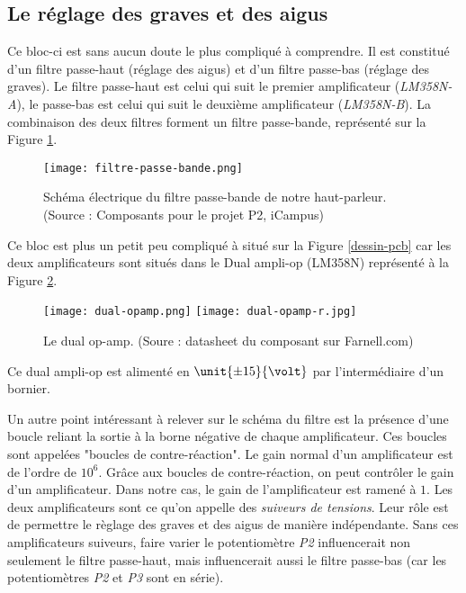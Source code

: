 \subsection{Le réglage des graves et des aigus}
Ce bloc-ci est sans aucun doute le plus compliqué à comprendre. Il est constitué d'un 
filtre passe-haut (réglage des aigus) et d'un filtre passe-bas (réglage des graves).
Le filtre passe-haut est celui qui suit le premier amplificateur (\textit{LM358N-A}),
le passe-bas est celui qui suit le deuxième amplificateur (\textit{LM358N-B}). 
La combinaison des deux filtres forment un filtre passe-bande, représenté sur la
Figure \ref{filtre}. 

\begin{figure}[!hbt]
	\centering
	\texttt{[image: filtre-passe-bande.png]}
	\caption{Schéma électrique du filtre passe-bande de notre haut-parleur.
	(Source : Composants pour le projet P2, iCampus)}
	\label{filtre}
\end{figure}

Ce bloc est plus un petit peu compliqué à situé sur la Figure
\ref{dessin-pcb} car les deux amplificateurs sont situés dans le Dual ampli-op (LM358N) 
représenté à la Figure \ref{dual-ampli-op}. 

\begin{figure}[!hbt]
	\centering
	\texttt{[image: dual-opamp.png]}
	\texttt{[image: dual-opamp-r.jpg]}
	\caption{Le dual op-amp. (Soure : datasheet du composant sur Farnell.com)}
	\label{dual-ampli-op}
\end{figure}

Ce dual ampli-op est alimenté en $\unit{\pm15}{\volt}$ par l'intermédiaire
d'un bornier.

Un autre point intéressant à relever sur le schéma du filtre est la présence d'une boucle 
reliant la sortie à la borne négative de chaque amplificateur. Ces boucles sont appelées
"boucles de contre-réaction".  Le gain normal d'un amplificateur est de l'ordre de $10^{6}$. 
Grâce aux boucles de contre-réaction, on peut contrôler le gain d'un amplificateur. 
Dans notre cas, le gain de l'amplificateur est ramené à $1$. 
Les deux amplificateurs sont ce qu'on appelle des \textit{suiveurs de tensions}. 
Leur rôle est de permettre le règlage des graves et des aigus de manière indépendante.
Sans ces amplificateurs suiveurs, faire varier le potentiomètre \textit{P2} influencerait 
non seulement le filtre passe-haut, mais influencerait aussi le filtre passe-bas 
(car les potentiomètres \textit{P2} et \textit{P3} sont en série).

